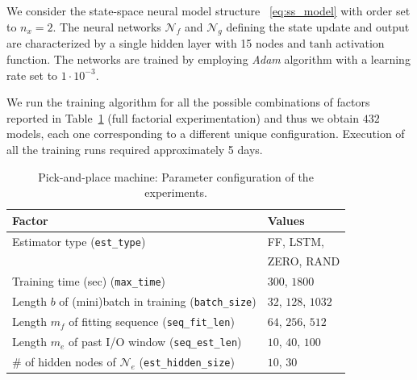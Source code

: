 \documentclass{article}
\newcommand{\NN}{\mathcal{N}} %
\newcommand{\nx}{{n_x}}
\begin{document}
We consider the state-space neural model structure ~\eqref{eq:ss_model}  with order set to $\nx = 2$.
The neural networks $\NN_f$ and $\NN_g$ defining the state update and output are characterized by a single hidden layer with 15 nodes and $\mathrm{tanh}$ activation function. The networks are trained by employing \emph{Adam} algorithm with a learning rate set to $1\cdot 10^{-3}$.

We run the training algorithm for all the possible combinations of factors reported in  Table~\ref{tab:parameters_p_and_p} (full factorial experimentation) and thus we obtain $432$ models, each one corresponding to a different unique configuration. Execution of all the training runs required approximately 5 days.

\begin{table}[t!]
    \centering
    \begin{tabular}{|l||l|}
    \hline
   Factor &  Values \\
    \hline 
Estimator type (\texttt{est\_type}) & FF, LSTM, \\
& ZERO, RAND \\
\hline 
Training time (sec) (\texttt{max\_time}) & $300$, $1800$ \\
\hline 
Length $b$ of (mini)batch in training   (\texttt{batch\_size}) & $32$, $128$, $1032$ \\ 
\hline
Length $m_f$ of fitting sequence (\texttt{seq\_fit\_len})&  $64$, $256$, $512$ \\
\hline
Length $m_e$ of past I/O window (\texttt{seq\_est\_len}) &  $10$, $40$, $100$ \\
\hline
\# of hidden nodes of $\mathcal{N}_e$ (\texttt{est\_hidden\_size})&  $10$, $30$\\
\hline 
    \end{tabular}
    \vspace{0.2cm}
    \caption{Pick-and-place machine: Parameter configuration of the experiments.}
    \label{tab:parameters_p_and_p}
\end{table}
\end{document}
